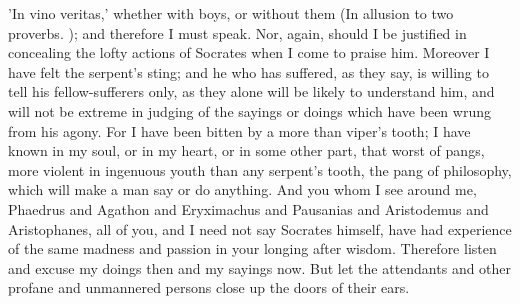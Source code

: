 \documentclass[11pt,letter]{article}
\begin{document}
'In vino veritas,' whether with boys, or without them (In allusion to two proverbs. ); and therefore I must speak. Nor, again, should I be justified in concealing the lofty actions of Socrates when I come to praise him. Moreover I have felt the serpent's sting; and he who has suffered, as they say, is willing to tell his fellow-sufferers only, as they alone will be likely to understand him, and will not be extreme in judging of the sayings or doings which have been wrung from his agony. For I have been bitten by a more than viper's tooth; I have known in my soul, or in my heart, or in some other part, that worst of pangs, more violent in ingenuous youth than any serpent's tooth, the pang of philosophy, which will make a man say or do anything. And you whom I see around me, Phaedrus and Agathon and Eryximachus and Pausanias and Aristodemus and Aristophanes, all of you, and I need not say Socrates himself, have had experience of the same madness and passion in your longing after wisdom. Therefore listen and excuse my doings then and my sayings now. But let the attendants and other profane and unmannered persons close up the doors of their ears.
\end{document}
